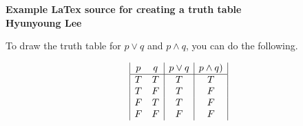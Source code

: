 \documentclass{article}
\begin{document}
\begin{center}
\textbf{Example LaTex source for creating a truth table\\[1ex]
Hyunyoung Lee}
\end{center}

To draw the truth table for $p \lor q$ and $p \land q$, you can do the following.

\begin{displaymath}
\begin{array}{|c c|c|c|}
p & q & p \lor q & p \land q)\\
\hline
T & T & T & T\\
T & F & T & F\\
F & T & T & F\\
F & F & F & F\\
\end{array}
\end{displaymath}
\end{document}
